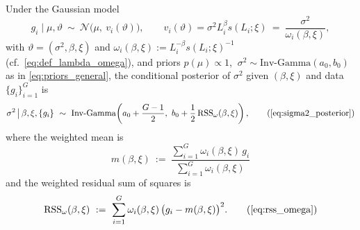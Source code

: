 \begin{proposition}\label{prop:sigma2-posterior}
Under the Gaussian model
\[
g_i \mid \mu,\vartheta \ \sim\ \mathcal{N}\!\big(\mu,\ v_i(\vartheta)\big),
\qquad
v_i(\vartheta)=\sigma^2 L_i^{\beta}s(L_i;\xi)\ =\ \frac{\sigma^2}{\omega_i(\beta,\xi)},
\]
with $\vartheta=(\sigma^2,\beta,\xi)$ and $\omega_i(\beta,\xi):=L_i^{-\beta}s(L_i;\xi)^{-1}$ (cf.\ \eqref{eq:def_lambda_omega}),
and priors $p(\mu)\propto 1$, $\ \sigma^2\sim\mathrm{Inv\text{-}Gamma}(a_0,b_0)$ as in \eqref{eq:priors_general},
the conditional posterior of $\sigma^2$ given $(\beta,\xi)$ and data $\{g_i\}_{i=1}^G$ is
\begin{equation}
  \sigma^2 \,\big|\, \beta,\xi,\{g_i\}
  \ \sim\
  \mathrm{Inv\text{-}Gamma}\!\left(
    a_0+\frac{G-1}{2},\
    b_0+\frac{1}{2}\,\mathrm{RSS}_\omega(\beta,\xi)
  \right),
  \tag{\ref{eq:sigma2_posterior}}
\end{equation}
where the weighted mean is
\[
m(\beta,\xi)\ :=\ \frac{\sum_{i=1}^G \omega_i(\beta,\xi)\,g_i}{\sum_{i=1}^G \omega_i(\beta,\xi)}
\]
and the weighted residual sum of squares is
\[
\mathrm{RSS}_\omega(\beta,\xi)\ :=\ \sum_{i=1}^G \omega_i(\beta,\xi)\,\big(g_i-m(\beta,\xi)\big)^2.
\tag{\ref{eq:rss_omega}}
\]
\end{proposition}

